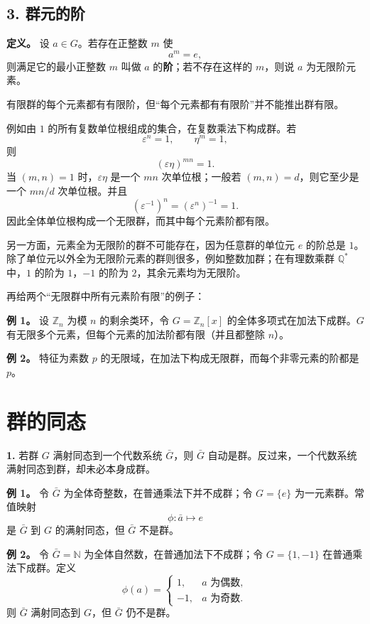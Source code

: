 \subsection*{3. 群元的阶}

\textbf{定义。} 设 $a\in G$。若存在正整数 $m$ 使
\[
a^m=e,
\]
则满足它的最小正整数 $m$ 叫做 $a$ 的\textbf{阶}；若不存在这样的 $m$，则说 $a$ 为无限阶元素。

有限群的每个元素都有有限阶，但“每个元素都有有限阶”并不能推出群有限。

例如由 $1$ 的所有复数单位根组成的集合，在复数乘法下构成群。若
\[
\varepsilon^n=1,
\qquad
\eta^m=1,
\]
则
\[
(\varepsilon\eta)^{mn}=1.
\]
当 $(m,n)=1$ 时，$\varepsilon\eta$ 是一个 $mn$ 次单位根；一般若 $(m,n)=d$，则它至少是一个 $mn/d$ 次单位根。并且
\[
(\varepsilon^{-1})^n=(\varepsilon^n)^{-1}=1.
\]
因此全体单位根构成一个无限群，而其中每个元素阶都有限。

另一方面，元素全为无限阶的群不可能存在，因为任意群的单位元 $e$ 的阶总是 $1$。除了单位元以外全为无限阶元素的群则很多，例如整数加群；在有理数乘群 $\mathbb Q^*$ 中，$1$ 的阶为 $1$，$-1$ 的阶为 $2$，其余元素均为无限阶。

再给两个“无限群中所有元素阶有限”的例子：

\textbf{例 1。} 设 $\mathbb Z_n$ 为模 $n$ 的剩余类环，令 $G=\mathbb Z_n[x]$ 的全体多项式在加法下成群。$G$ 有无限多个元素，但每个元素的加法阶都有限（并且都整除 $n$）。

\textbf{例 2。} 特征为素数 $p$ 的无限域，在加法下构成无限群，而每个非零元素的阶都是 $p$。

\section{群的同态}

\textbf{1.} 若群 $G$ 满射同态到一个代数系统 $\bar G$，则 $\bar G$ 自动是群。反过来，一个代数系统满射同态到群，却未必本身成群。

\textbf{例 1。} 令 $\bar G$ 为全体奇整数，在普通乘法下并不成群；令 $G=\{e\}$ 为一元素群。常值映射
\[
\phi:\bar a\longmapsto e
\]
是 $\bar G$ 到 $G$ 的满射同态，但 $\bar G$ 不是群。

\textbf{例 2。} 令 $\bar G=\mathbb N$ 为全体自然数，在普通加法下不成群；令 $G=\{1,-1\}$ 在普通乘法下成群。定义
\[
\phi(a)=\begin{cases}
1,&a\text{ 为偶数},\\
-1,&a\text{ 为奇数}.
\end{cases}
\]
则 $\bar G$ 满射同态到 $G$，但 $\bar G$ 仍不是群。

